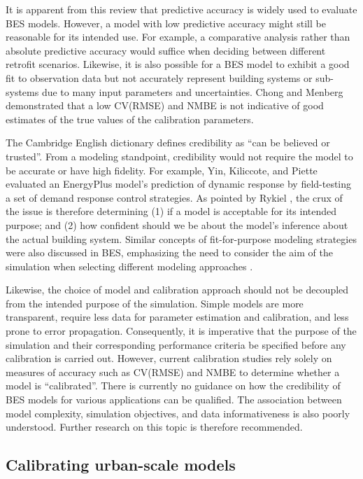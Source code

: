 \documentclass[review]{elsarticle}
\begin{document}
It is apparent from this review that predictive accuracy is widely used to evaluate BES models. However, a model with low predictive accuracy might still be reasonable for its intended use. For example, a comparative analysis rather than absolute predictive accuracy would suffice when deciding between different retrofit scenarios. Likewise, it is also possible for a BES model to exhibit a good fit to observation data but not accurately represent building systems or sub-systems due to many input parameters and uncertainties. Chong and Menberg \cite{chong2018guidelines} demonstrated that a low CV(RMSE) and NMBE is not indicative of good estimates of the true values of the calibration parameters. 

The Cambridge English dictionary defines credibility as ``can be believed or trusted''. From a modeling standpoint, credibility would not require the model to be accurate or have high fidelity. For example, Yin, Kiliccote, and Piette \cite{yin2016linking} evaluated an EnergyPlus model's prediction of dynamic response by field-testing a set of demand response control strategies. As pointed by Rykiel \cite{rykiel1996testing}, the crux of the issue is therefore determining (1) if a model is acceptable for its intended purpose; and (2) how confident should we be about the model's inference about the actual building system. Similar concepts of fit-for-purpose modeling strategies were also discussed in BES, emphasizing the need to consider the aim of the simulation when selecting different modeling approaches \cite{trvcka2010overview, gaetani2016occupant, gaetani2020stepwise, chong2021occupancy, zhan2021data}. 

Likewise, the choice of model and calibration approach should not be decoupled from the intended purpose of the simulation. Simple models are more transparent, require less data for parameter estimation and calibration, and less prone to error propagation. Consequently, it is imperative that the purpose of the simulation and their corresponding performance criteria be specified before any calibration is carried out. However, current calibration studies rely solely on measures of accuracy such as CV(RMSE) and NMBE to determine whether a model is ``calibrated''. There is currently no guidance on how the credibility of BES models for various applications can be qualified. The association between model complexity, simulation objectives, and data informativeness is also poorly understood. Further research on this topic is therefore recommended. 

\subsection{Calibrating urban-scale models}
\end{document}

